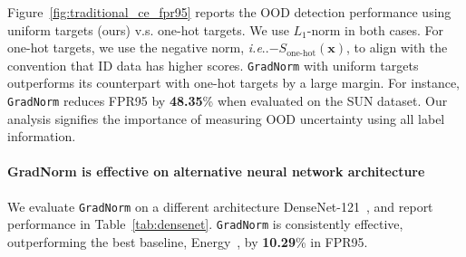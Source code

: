 \documentclass{article}
\makeatletter
\def\*#1{\mathbf{#1}}
\DeclareRobustCommand\onedot{\futurelet\@let@token\@onedot}
\def\@onedot{\ifx\@let@token.\else.\null\fi\xspace}
\def\ie{\emph{i.e}\onedot} \def\Ie{\emph{I.e}\onedot}
\makeatother
\begin{document}
Figure~\ref{fig:traditional_ce_fpr95} reports the OOD detection performance using uniform targets (ours) v.s. one-hot targets. We use $L_1$-norm in both cases. For one-hot targets, we use the negative norm, \ie $-S_\text{one-hot}(\*x)$, to align with the convention that ID data has higher scores. \texttt{GradNorm} with uniform targets outperforms its counterpart with one-hot targets by a large margin. For instance, \texttt{GradNorm} reduces FPR95 by \textbf{48.35}\% when evaluated on the SUN dataset. Our analysis signifies the importance of measuring OOD uncertainty using all label information.





\paragraph{GradNorm is effective on alternative neural network architecture} We evaluate \texttt{GradNorm} on a different architecture DenseNet-121~\cite{huang2017densely}, and report performance in Table~\ref{tab:densenet}. \texttt{GradNorm} is consistently effective, outperforming the best baseline, Energy~\cite{liu2020energy}, by \textbf{10.29}\% in FPR95. 
\end{document}
